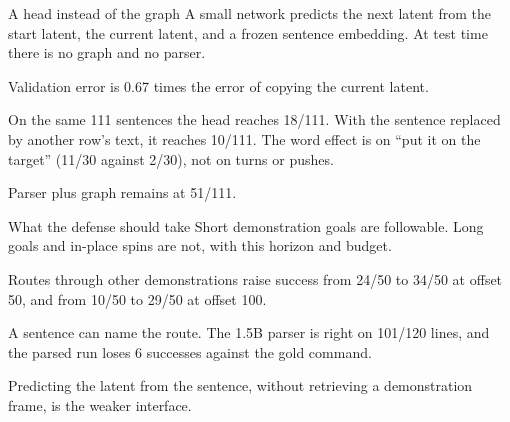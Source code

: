 \documentclass[aspectratio=169,11pt]{beamer}
\begin{document}
\begin{frame}{A head instead of the graph}
  A small network predicts the next latent from the start latent, the current latent, and a frozen sentence embedding.
  At test time there is no graph and no parser.

  Validation error is 0.67 times the error of copying the current latent.

  On the same 111 sentences the head reaches 18/111.
  With the sentence replaced by another row's text, it reaches 10/111.
  The word effect is on ``put it on the target'' (11/30 against 2/30), not on turns or pushes.

  Parser plus graph remains at 51/111.
\end{frame}

\begin{frame}{What the defense should take}
  Short demonstration goals are followable. Long goals and in-place spins are not, with this horizon and budget.

  Routes through other demonstrations raise success from 24/50 to 34/50 at offset 50, and from 10/50 to 29/50 at offset 100.

  A sentence can name the route. The 1.5B parser is right on 101/120 lines, and the parsed run loses 6 successes against the gold command.

  Predicting the latent from the sentence, without retrieving a demonstration frame, is the weaker interface.
\end{frame}
\end{document}
